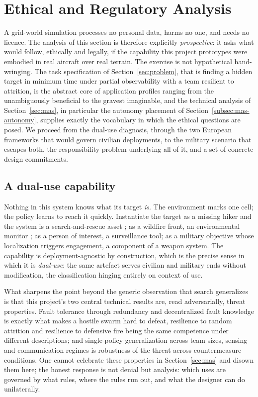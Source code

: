 \section{Ethical and Regulatory Analysis}
\label{sec:ethics}

A grid-world simulation processes no personal data, harms no one, and needs no
licence. The analysis of this section is therefore explicitly
\emph{prospective}: it asks what would follow, ethically and legally, if the
capability this project prototypes were embodied in real aircraft over real
terrain. The exercise is not hypothetical hand-wringing. The task specification
of Section~\ref{sec:problem}, that is finding a hidden target in minimum time
under partial observability with a team resilient to attrition, is the abstract
core of application profiles ranging from the unambiguously beneficial to the
gravest imaginable, and the technical analysis of Section~\ref{sec:mas},
in particular the autonomy placement of Section~\ref{subsec:mas-autonomy},
supplies exactly the vocabulary in which the ethical questions are posed. We
proceed from the dual-use diagnosis, through the two European frameworks that
would govern civilian deployments, to the military scenario that escapes both,
the responsibility problem underlying all of it, and a set of concrete design
commitments.

\subsection{A dual-use capability}
\label{subsec:eth-dualuse}

Nothing in this system knows what its target \emph{is}. The environment marks
one cell; the policy learns to reach it quickly. Instantiate the target as a
missing hiker and the system is a search-and-rescue asset
\citep{queralta2020collaborative}; as a wildfire front, an environmental monitor
\citep{julian2019distributed}; as a person of interest, a surveillance tool; as
a military objective whose localization triggers engagement, a component of a
weapon system. The capability is deployment-agnostic by construction, which is
the precise sense in which it is \emph{dual-use}: the same artefact serves
civilian and military ends without modification, the classification hinging
entirely on context of use.

What sharpens the point beyond the generic observation that search generalizes
is that this project's two central technical results are, read adversarially,
threat properties. Fault tolerance through redundancy and decentralized fault
knowledge is exactly what makes a hostile swarm hard to defeat, resilience to
random attrition and resilience to defensive fire being the same competence under
different descriptions; and single-policy generalization across team sizes,
sensing and communication regimes is robustness of the threat across
countermeasure conditions. One cannot celebrate these properties in
Section~\ref{sec:mas} and disown them here; the honest response is not denial
but analysis: which uses are governed by what rules, where the rules run out, and
what the designer can do unilaterally.

